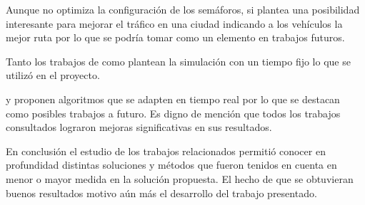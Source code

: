 Aunque \citet{Stolfi2012} no optimiza la configuración de los semáforos, si plantea una posibilidad interesante para mejorar el tráfico en una ciudad indicando a los vehículos la mejor ruta por lo que se podría tomar como un elemento en trabajos futuros.

Tanto los trabajos de \citet{Teo2010} como \citet{Stolfi2012} plantean la simulación con un tiempo fijo lo que se utilizó en el proyecto.

\citet{Montana1996} y \citet{Vogel2000}  proponen algoritmos que se adapten en tiempo real por lo que se destacan como posibles trabajos a futuro.
Es digno de mención que todos los trabajos consultados lograron mejoras significativas en sus resultados.

En conclusión el estudio de los trabajos relacionados permitió conocer en profundidad distintas soluciones y métodos que fueron tenidos en cuenta en menor o mayor medida en la solución propuesta. El hecho de que se obtuvieran buenos resultados motivo aún más el desarrollo del trabajo presentado.





